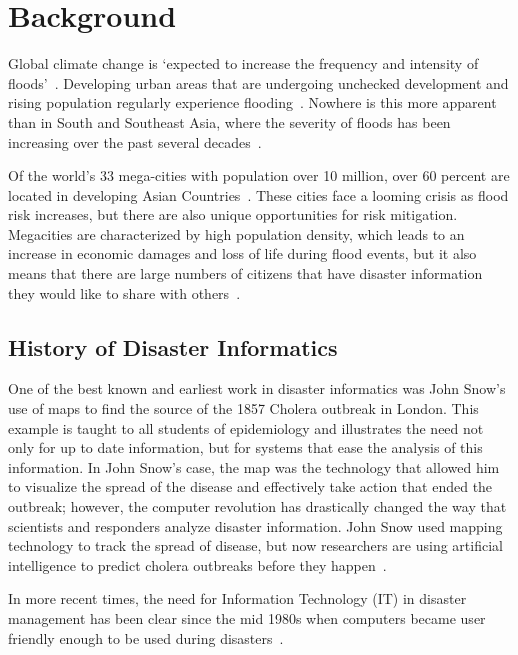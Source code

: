 \chapter{Background}

Global climate change is `expected to increase the frequency and intensity of
floods'~\cite{ahernGlobalHealthImpacts2005}. Developing urban areas that are
undergoing unchecked development and rising population regularly experience
flooding~\cite{chanFloodRiskAsia2012}.  Nowhere is this more apparent than
in South and Southeast Asia, where the severity of floods has been increasing
over the past several decades~\cite{tortiFloodsSoutheastAsia2012}.

Of the world's 33 mega-cities with population over 10 million, over 60 percent
are located in developing Asian
Countries~\cite{unitednationsdepartmentofeconomicandsocialaffairsWorldCities20162016}.
These cities face a looming crisis as flood risk increases, but there are also
unique opportunities for risk mitigation. Megacities are characterized by high
population density, which leads to an increase in economic damages and loss of
life during flood events, but it also means that there are large numbers of
citizens that have disaster information they would like to share with
others~\cite{chanFloodRiskAsia2012}.

\section{History of Disaster Informatics} One of the best known and earliest
work in disaster informatics was John Snow's use of maps to find the source of
the 1857 Cholera outbreak in London\cite{rogersJohnSnowData2013}. This example
is taught to all students of epidemiology and illustrates the need
not only for up to date information, but for systems that ease the
analysis of this information. In John Snow's case, the map was the technology
that allowed him to visualize the spread of the disease and effectively take
action that ended the outbreak; however, the computer revolution has drastically
changed the way that scientists and responders analyze disaster information.
John Snow used mapping technology to track the spread of disease, but now
researchers are using artificial intelligence to predict cholera outbreaks
before they happen~\cite{radinskyMiningWebPredict2013}.

In more recent times, the need for Information Technology (IT) in disaster
management has been clear since the mid 1980s when computers became user
friendly enough to be used during
disasters~\cite{universityTerminalDisastersComputer1986}.

